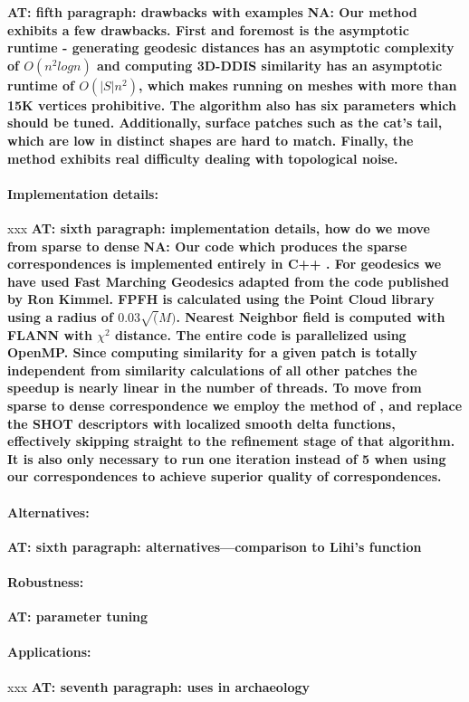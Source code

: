 \documentclass[10pt,twocolumn,letterpaper]{article}
\newcommand{\colornote}[3]{{\color{#1}\bf{#2: #3}\normalfont}}
\newcommand{\colornote}[3]{}
\newcommand {\ayellet}[1]{\colornote{blue}{AT}{#1}}
\newcommand {\nadav}[1]{\colornote{red}{NA}{#1}}
\begin{document}
\ayellet{fifth paragraph: drawbacks with examples}
\nadav{Our method exhibits a few drawbacks. First and foremost is the asymptotic runtime - generating geodesic distances has an asymptotic complexity of $O(n^2 logn)$ and computing 3D-DDIS similarity has an asymptotic runtime of $O(|S|n^2)$, which makes running on meshes with more than 15K vertices prohibitive. The algorithm  also has six parameters which should be tuned. Additionally, surface patches such as the cat's tail, which are low in distinct shapes are hard to match. Finally, the method exhibits real difficulty dealing with topological noise.}

\paragraph{Implementation details:} xxx
\ayellet{sixth paragraph: implementation details, how do we move from sparse to dense}
\nadav{Our code which produces the sparse correspondences is implemented entirely in C++ . For geodesics we have used Fast Marching Geodesics adapted from the code published by Ron Kimmel.
FPFH is calculated using the Point Cloud library\cite{} using a radius of $0.03\sqrt(M)$. Nearest Neighbor field is computed with FLANN\cite{} with $\chi^2$ distance. 
The entire code is parallelized using OpenMP. Since computing similarity for a given patch is totally independent from similarity calculations of all other patches the speedup is nearly linear in the number of threads.
To move from sparse to dense correspondence we employ the method of \cite{litany2017fully}, and replace the SHOT descriptors with localized smooth delta functions, effectively skipping straight to the refinement stage of that algorithm. It is also only necessary to run one iteration instead of 5 when using our correspondences to achieve superior quality of correspondences.}

\paragraph{Alternatives:} 
\ayellet{sixth paragraph: alternatives---comparison to Lihi's function}

\paragraph{Robustness:} 
\ayellet{parameter tuning}

\paragraph{Applications:} xxx
\ayellet{seventh paragraph: uses in archaeology}
\end{document}
